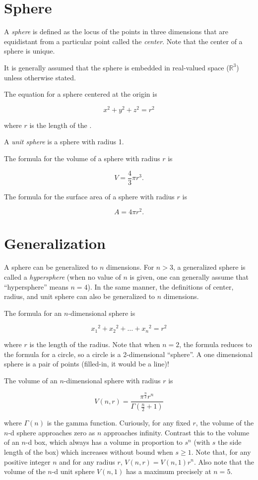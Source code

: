 \documentclass[12pt]{article}
\theoremstyle{definition}
\theoremstyle{definition}
\theoremstyle{definition}
\begin{document}
\section{Sphere}

A \emph{sphere} is defined as the locus of the points in three dimensions that are equidistant from a particular point called the \emph{center}.  Note that the center of a sphere is unique.

It is generally assumed that the sphere is embedded in real-valued space ($\mathbb{R}^3$) unless otherwise stated.

The equation for a sphere centered at the origin is 

\[ x^2+y^2+z^2=r^2 \]

where $r$ is the length of the .

A \emph{unit sphere} is a sphere with radius 1.

The formula for the volume of a sphere with radius $r$ is

\[ V = \frac{4}{3} \pi r^3. \]

The formula for the surface area of a sphere with radius $r$ is

\[ A = 4 \pi r^2. \]

\section{Generalization}

A sphere can be generalized to $n$ dimensions.  For $n > 3$, a generalized sphere is called a \emph{hypersphere} (when no value of $n$ is given, one can generally assume that ``hypersphere'' means $n = 4$).  In the same manner, the definitions of center, radius, and unit sphere can also be generalized to $n$ dimensions.

The formula for an $n$-dimensional sphere is

\[ {x_1}^2 + {x_2}^2 + \dots + {x_n}^2 = r^2 \]

where $r$ is the length of the radius.  Note that when $n=2$, the formula reduces to the formula for a circle, so a circle is a 2-dimensional ``sphere''.  A one dimensional sphere is a pair of points (filled-in, it would be a line)!

The volume of an $n$-dimensional sphere with radius $r$ is

\[ V(n,r) = \frac{\pi^{\frac{n}{2}}r^n}{\Gamma(\frac{n}{2}+1)} \]

where $\Gamma(n)$ is the gamma function. Curiously, for any fixed $r$, the volume of the $n$-d sphere approaches zero as $n$ approaches infinity.    Contrast this to the volume of an $n$-d box, which always has a volume in proportion to $s^n$ (with $s$ the side length of the box) which increases without bound when $s \ge 1$. Note that, for any positive integer $n$ and for any radius $r$, $V(n,r)=V(n,1)r^n$. Also note that the volume of the $n$-d unit sphere $V(n,1)$ has a maximum precisely at $n=5$.
\end{document}
